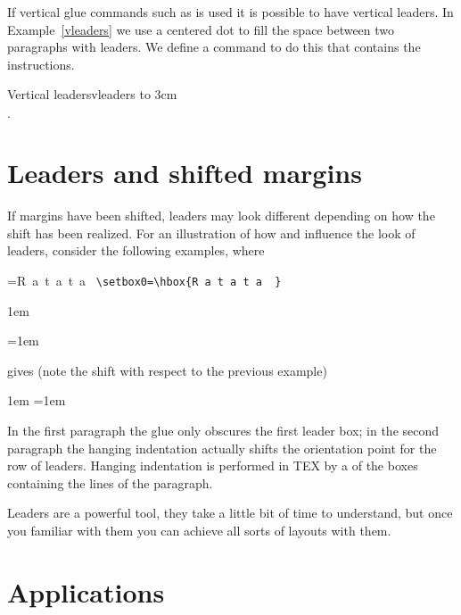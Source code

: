 If vertical glue commands such as  is used it is possible to have
vertical leaders. In Example~\ref{vleaders} we use a centered dot  to fill the space between two paragraphs with leaders. We define a command
 to do this that contains the instructions.

\begin{texexample}{Vertical leaders}{vleaders}
\newcommand{\vdotfill}{%
  \par\leaders\hbox{$\cdot$}\vfill}
  \vbox to 3cm{
  \lorem
  \vdotfill
  \lorem
  }
\end{texexample}





\section{Leaders and shifted margins}

If margins have been shifted, leaders may look different depending on how the shift has been realized.
For an illustration of how and influence the look of leaders, consider
the following examples, where

=\hbox{R a t a t a  }
\verb+\setbox0=\hbox{R a t a t a  }+



\hbox{\kern1em\hbox{\leaders{}\hskip5cm}}

\hangindent=1em  \noindent
\leaders{}\hskip5cm\hbox{}\par


gives (note the shift with respect to the previous example)
\medskip

{\hbox{\kern1em\hbox{\leaders{}\hskip5cm}}
\hangindent=1em  \noindent
\leaders{}\hskip5cm\hbox{}\par}

In the first paragraph the glue only obscures the first leader box; in the second paragraph
the hanging indentation actually shifts the orientation point for the row of leaders. Hanging
indentation is performed in TEX by a of the boxes containing the lines of the
paragraph.

   

Leaders are a powerful tool, they take a little bit of time to understand, but once you familiar with them you can achieve all sorts of layouts with them.


\section{Applications}

